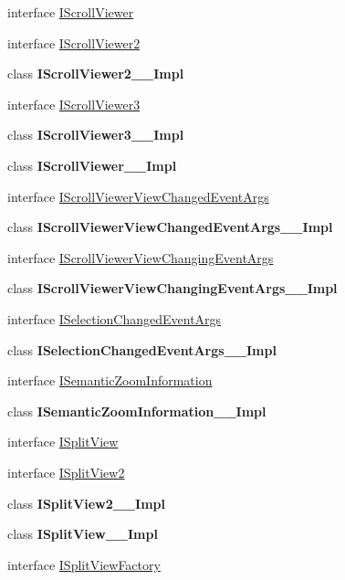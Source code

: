 \begin{DoxyCompactItemize}
interface \hyperlink{interface_windows_1_1_u_i_1_1_xaml_1_1_controls_1_1_i_scroll_viewer}{I\+Scroll\+Viewer}
\item 
interface \hyperlink{interface_windows_1_1_u_i_1_1_xaml_1_1_controls_1_1_i_scroll_viewer2}{I\+Scroll\+Viewer2}
\item 
class {\bfseries I\+Scroll\+Viewer2\+\_\+\+\_\+\+Impl}
\item 
interface \hyperlink{interface_windows_1_1_u_i_1_1_xaml_1_1_controls_1_1_i_scroll_viewer3}{I\+Scroll\+Viewer3}
\item 
class {\bfseries I\+Scroll\+Viewer3\+\_\+\+\_\+\+Impl}
\item 
class {\bfseries I\+Scroll\+Viewer\+\_\+\+\_\+\+Impl}
\item 
interface \hyperlink{interface_windows_1_1_u_i_1_1_xaml_1_1_controls_1_1_i_scroll_viewer_view_changed_event_args}{I\+Scroll\+Viewer\+View\+Changed\+Event\+Args}
\item 
class {\bfseries I\+Scroll\+Viewer\+View\+Changed\+Event\+Args\+\_\+\+\_\+\+Impl}
\item 
interface \hyperlink{interface_windows_1_1_u_i_1_1_xaml_1_1_controls_1_1_i_scroll_viewer_view_changing_event_args}{I\+Scroll\+Viewer\+View\+Changing\+Event\+Args}
\item 
class {\bfseries I\+Scroll\+Viewer\+View\+Changing\+Event\+Args\+\_\+\+\_\+\+Impl}
\item 
interface \hyperlink{interface_windows_1_1_u_i_1_1_xaml_1_1_controls_1_1_i_selection_changed_event_args}{I\+Selection\+Changed\+Event\+Args}
\item 
class {\bfseries I\+Selection\+Changed\+Event\+Args\+\_\+\+\_\+\+Impl}
\item 
interface \hyperlink{interface_windows_1_1_u_i_1_1_xaml_1_1_controls_1_1_i_semantic_zoom_information}{I\+Semantic\+Zoom\+Information}
\item 
class {\bfseries I\+Semantic\+Zoom\+Information\+\_\+\+\_\+\+Impl}
\item 
interface \hyperlink{interface_windows_1_1_u_i_1_1_xaml_1_1_controls_1_1_i_split_view}{I\+Split\+View}
\item 
interface \hyperlink{interface_windows_1_1_u_i_1_1_xaml_1_1_controls_1_1_i_split_view2}{I\+Split\+View2}
\item 
class {\bfseries I\+Split\+View2\+\_\+\+\_\+\+Impl}
\item 
class {\bfseries I\+Split\+View\+\_\+\+\_\+\+Impl}
\item 
interface \hyperlink{interface_windows_1_1_u_i_1_1_xaml_1_1_controls_1_1_i_split_view_factory}{I\+Split\+View\+Factory}

\end{DoxyCompactItemize}
